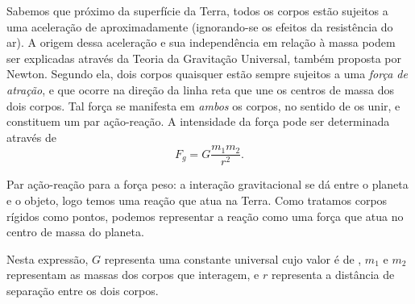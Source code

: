 Sabemos que próximo da superfície da Terra, todos os corpos estão sujeitos a uma aceleração de aproximadamente  (ignorando-se os efeitos da resistência do ar). A origem dessa aceleração e sua independência em relação à massa podem ser explicadas através da Teoria da Gravitação Universal, também proposta por Newton. Segundo ela, dois corpos quaisquer estão sempre  sujeitos a uma \emph{força de atração}, e que ocorre na direção da linha reta que une os centros de massa dos dois corpos. Tal força se manifesta em \emph{ambos} os corpos, no sentido de os unir, e constituem um par ação-reação. A intensidade da força pode ser determinada através de
\begin{equation}\label{Eq:LeiGravitacaoUniversal}
  F_g = G \frac{m_1 m_2}{r^2}.
\end{equation}

\begin{marginfigure}
\centering
{}
\caption{Par ação-reação para a força peso: a interação gravitacional se dá entre o planeta e o objeto, logo temos uma reação que atua na Terra. Como tratamos corpos rígidos como pontos, podemos representar a reação como uma força que atua no centro de massa do planeta.}
\end{marginfigure}

\noindent{}Nesta expressão, $G$ representa uma constante universal cujo valor é de , $m_1$ e $m_2$ representam as massas dos corpos que interagem, e $r$ representa a distância de separação entre os dois corpos.

